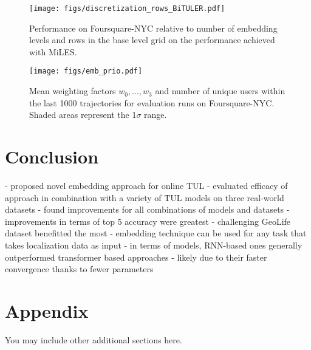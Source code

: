 \documentclass{article} %
\theoremstyle{definition}
\begin{document}
\begin{figure}[h]
    \centering
    \texttt{[image: figs/discretization\_rows\_BiTULER.pdf]}
    \caption{Performance on Foursquare-NYC relative to number of embedding levels and rows in the base level grid on the performance achieved with MiLES.}
    \label{fig:discretization}
\end{figure}

\begin{figure}[h]
    \centering
    \texttt{[image: figs/emb\_prio.pdf]}
    \caption{Mean weighting factors $w_0, ..., w_3$ and number of unique users within the last 1000 trajectories for evaluation runs on Foursquare-NYC. Shaded areas represent the 1$\sigma$ range.}
    \label{fig:emb_prio}
\end{figure}


\section{Conclusion}

- proposed novel embedding approach for online TUL
- evaluated efficacy of approach in combination with a variety of TUL models on three real-world datasets
- found improvements for all combinations of models and datasets
- improvements in terms of top 5 accuracy were greatest
- challenging GeoLife dataset benefitted the most
- embedding technique can be used for any task that takes localization data as input
- in terms of models, RNN-based ones generally outperformed transformer based approaches
- likely due to their faster convergence thanks to fewer parameters




\appendix
\section{Appendix}
You may include other additional sections here.
\end{document}
